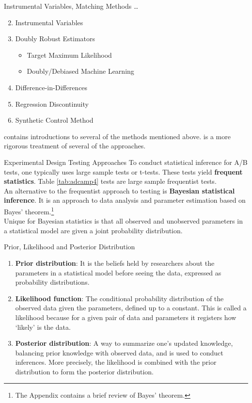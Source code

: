 \documentclass[pdf]{beamer}
\newcommand{\empr}[1]{{\color{franklinblue}\textbf{#1}}}
\theoremstyle{remark}
\theoremstyle{definition}
\begin{document}
\begin{frame}[t]{Instrumental Variables, Matching Methods \ldots}
\begin{enumerate}
  \setcounter{enumi}{1}
\item Instrumental Variables
\item Doubly Robust Estimators
\begin{itemize}
  \item Target Maximum Likelihood
  \item Doubly/Debiased Machine Learning
\end{itemize}
\item Difference-in-Differences
\item Regression Discontinuity
\item Synthetic Control Method
\end{enumerate}
\cite{taddy2023} contains introductions to several of the methods mentioned above. \cite{hernan2020} is a more rigorous treatment of several of the approaches. 

\end{frame}

\begin{frame}[t]{Experimental Design Testing Approaches}
To conduct statistical inference for A/B tests, one typically uses large sample tests or t-tests.  These tests yield \empr{frequent statistics}. Table \ref{tab:adcamp4} tests are large sample frequentist tests. \\
\vspace{1.5ex}
An alternative to the frequentist approach to testing is \empr{Bayesian statistical inference}. It is an approach to data analysis and parameter estimation based on Bayes' theorem.\footnote{The Appendix contains a brief review of Bayes' theorem.} \\
\vspace{1.5ex}
Unique for Bayesian statistics is that all observed and unobserved parameters in a statistical model are given a joint probability distribution. \\
\vspace{1.5ex}
\end{frame}

\begin{frame}[t]{Prior, Likelihood and Posterior Distribution}
\begin{enumerate}
\item \empr{Prior distribution}:  It is the beliefs held by researchers about the parameters in a statistical model before seeing the data, expressed as probability distributions.
\item \empr{Likelihood function}: The conditional probability distribution of the observed data given the parameters, defined up to a constant. This is called a likelihood because for a given pair of data and parameters it registers how `likely' is the data.
\item \empr{Posterior distribution}: A way to summarize one's updated knowledge, balancing prior knowledge with observed data, and is used to conduct inferences. More precisely, the likelihood is combined with the prior distribution to form the posterior distribution.
\end{enumerate} 
\end{frame}
\end{document}
